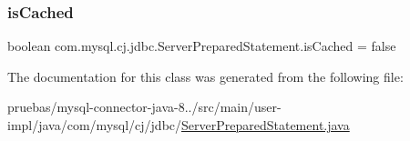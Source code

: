 \subsubsection{\texorpdfstring{is\+Cached}{isCached}}
{\footnotesize\ttfamily boolean com.\+mysql.\+cj.\+jdbc.\+Server\+Prepared\+Statement.\+is\+Cached = false\hspace{0.3cm}{\ttfamily [protected]}}



The documentation for this class was generated from the following file\+:\begin{DoxyCompactItemize}
\item 
pruebas/mysql-\/connector-\/java-\/8../src/main/user-\/impl/java/com/mysql/cj/jdbc/\mbox{\hyperlink{_server_prepared_statement_8java}{Server\+Prepared\+Statement.\+java}}\end{DoxyCompactItemize}
